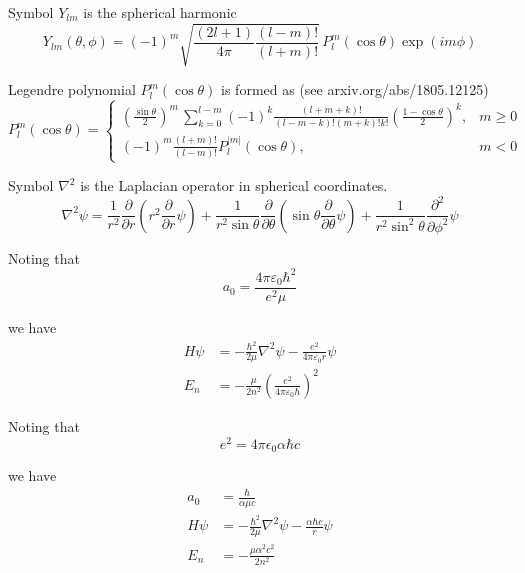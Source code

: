 Symbol $Y_{lm}$ is the spherical harmonic
\begin{equation*}
Y_{lm}(\theta,\phi)=(-1)^m
\sqrt{\frac{(2l+1)}{4\pi}
\frac{(l-m)!}{(l+m)!}}\,
P_l^m(\cos\theta)\exp(im\phi)
\end{equation*}

Legendre polynomial $P_l^m(\cos\theta)$ is formed as (see arxiv.org/abs/1805.12125)
\begin{equation*}
P_l^m(\cos\theta)=\begin{cases}
\displaystyle
\left(\frac{\sin\theta}{2}\right)^m\,\sum_{k=0}^{l-m}
(-1)^k\frac{(l+m+k)!}{(l-m-k)!(m+k)!k!}
\left(\frac{1-\cos\theta}{2}\right)^k, & m\ge0
\\[4ex]
\displaystyle
(-1)^m\frac{(l+m)!}{(l-m)!}P_l^{|m|}(\cos\theta), & m<0
\end{cases}
\end{equation*}

Symbol $\nabla^2$ is the Laplacian operator in spherical coordinates.
\begin{equation*}
\nabla^2\psi=\frac{1}{r^2}\frac{\partial}{\partial r}
\left(r^2\frac{\partial}{\partial r}\psi\right)
+
\frac{1}{r^2\sin\theta}\frac{\partial}{\partial\theta}
\left(\sin\theta\frac{\partial}{\partial\theta}\psi\right)
+
\frac{1}{r^2\sin^2\theta}\frac{\partial^2}{\partial\phi^2}\psi
\end{equation*}

Noting that
\begin{equation*}
a_0=\frac{4\pi\varepsilon_0\hbar^2}{e^2\mu}
\end{equation*}

we have
\begin{align*}
H\psi&=-\frac{\hbar^2}{2\mu}\nabla^2\psi-\frac{e^2}{4\pi\varepsilon_0 r}\psi
\\
E_n&=-\frac{\mu}{2n^2}\left(\frac{e^2}{4\pi\varepsilon_0\hbar}\right)^2
\end{align*}

Noting that
\begin{equation*}
e^2=4\pi\epsilon_0\alpha\hbar c
\end{equation*}

we have
\begin{align*}
a_0&=\frac{\hbar}{\alpha\mu c}
\\
H\psi&=-\frac{\hbar^2}{2\mu}\nabla^2\psi-\frac{\alpha\hbar c}{r}\psi
\\
E_n&=-\frac{\mu\alpha^2c^2}{2n^2}
\end{align*}


